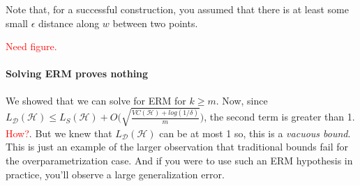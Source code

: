 Note that, for a successful construction, you assumed that there is at least some small $\epsilon$ distance along $w$ between two points.

\textcolor{red}{Need figure.}

\paragraph{Solving ERM proves nothing} We showed that we can solve for ERM for $k \geq m$. Now, since $L_\mathcal{D}(\mathcal{H}) \leq L_S(\mathcal{H}) + O\big(\sqrt{\frac{VC(\mathcal{H}) + log(1/\delta)}{m}}\big)$, the second term is greater than 1. \textcolor{red}{How?}. But we knew that $L_\mathcal{D}(\mathcal{H})$ can be at most 1 so, this is a \textit{vacuous bound}. This is just an example of the larger observation that traditional bounds fail for the overparametrization case. And if you were to use such an ERM hypothesis in practice, you'll observe a large generalization error.